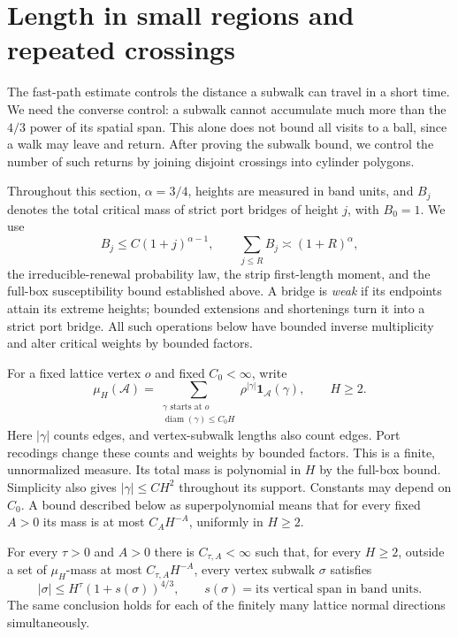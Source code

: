 \section{Length in small regions and repeated crossings}
\label{sec:11-slow-covering}

The fast-path estimate controls the distance a subwalk can travel in a
short time. We need the converse control: a subwalk cannot accumulate
much more than the $4/3$ power of its spatial span. This alone does not
bound all visits to a ball, since a walk may leave and return. After
proving the subwalk bound, we control the number of such returns by
joining disjoint crossings into cylinder polygons.

Throughout this section, $\alpha=3/4$, heights are measured in band units,
and $B_j$ denotes the total critical mass of strict port bridges of height
$j$, with $B_0=1$. We use
\[
 B_j\le C(1+j)^{\alpha-1},\qquad
 \sum_{j\le R}B_j\asymp (1+R)^\alpha,
\]
the irreducible-renewal probability law, the strip first-length moment,
and the full-box susceptibility bound established above. A bridge is
\emph{weak} if its endpoints attain its extreme heights; bounded extensions
and shortenings turn it into a strict port bridge. All such operations
below have bounded inverse multiplicity and alter critical weights by
bounded factors.

For a fixed lattice vertex $o$ and fixed $C_0<\infty$, write
\[
 \mu_H(\mathcal A)=
 \sum_{\substack{\gamma\text{ starts at }o\\
                  \operatorname{diam}(\gamma)\le C_0H}}
       \rho^{|\gamma|}\mathbf 1_{\mathcal A}(\gamma),\qquad H\ge2.
\]
Here \(|\gamma|\) counts edges, and vertex-subwalk lengths also count
edges. Port recodings change these counts and weights by bounded factors.
This is a finite, unnormalized measure. Its total mass is polynomial in
$H$ by the full-box bound. Simplicity also gives
$|\gamma|\le C H^2$ throughout its support. Constants may depend on $C_0$.
A bound described below as superpolynomial means that for every fixed
$A>0$ its mass is at most $C_AH^{-A}$, uniformly in $H\ge2$.

\begin{theorem}\label{thm:11-local-length}
For every $\tau>0$ and $A>0$ there is $C_{\tau,A}<\infty$ such that,
for every $H\ge2$, outside a set of $\mu_H$-mass at most
$C_{\tau,A}H^{-A}$, every vertex subwalk $\sigma$ satisfies
\begin{equation}
 |\sigma|\le H^\tau(1+s(\sigma))^{4/3},
 \qquad s(\sigma)=\text{its vertical span in band units}.
 \label{eq:L-37}
\end{equation}
The same conclusion holds for each of the finitely many lattice
normal directions simultaneously.
\end{theorem}

